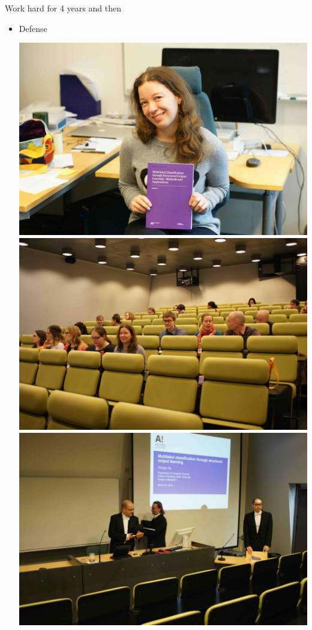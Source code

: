 \documentclass[first=dgreen,second=purple,logo=yellowexc]{aaltoslides}
\begin{document}
\begin{frame}{Work hard for 4 years and then}
	\begin{itemize}
		\item Defense
		\begin{center}
			\includegraphics[scale=0.02,angle=0]{./plots/df2.jpg}
			\includegraphics[scale=0.02,angle=0]{./plots/df3.jpg}
			\includegraphics[scale=0.02,angle=0]{./plots/df4.jpg}

\end{center}
\end{itemize}
\end{frame}
\end{document}
